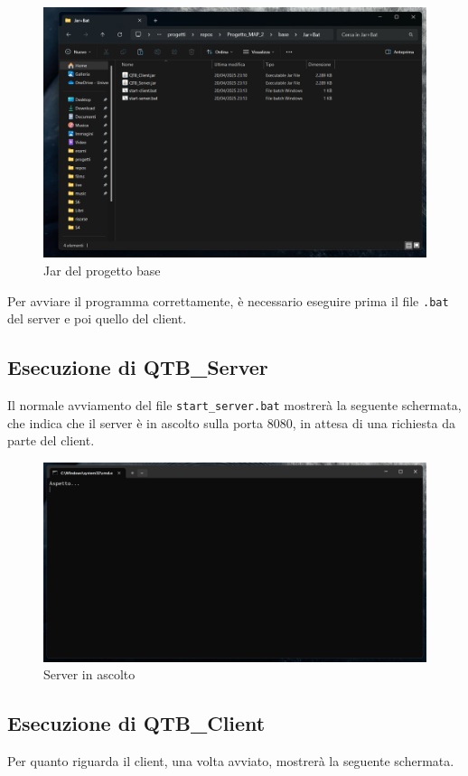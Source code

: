 \begin{figure}[h!]
    \centering
    \includegraphics[width = 0.5 \textwidth]{images/file jar base.png}
    \caption{Jar del progetto base}
\end{figure}


\begin{tcolorbox}[  colback=white!5!white, colframe=gray, title={Avvertenza} ]

    Per avviare il programma correttamente, è necessario eseguire prima il file \texttt{.bat} del server e poi quello del client.
\end{tcolorbox}

\subsection{Esecuzione di QTB\_Server}


Il normale avviamento del file \texttt{start\_server.bat} mostrerà la seguente schermata, che indica che il server è in ascolto sulla porta 8080, in attesa di una richiesta da parte del client.

\begin{figure}[h!]
    \centering
    \includegraphics[width = 0.5 \textwidth]{images/normale funzionamento del server.png}
    \caption{Server in ascolto}
    
\end{figure}

\subsection{Esecuzione di QTB\_Client}

Per quanto riguarda il client, una volta avviato, mostrerà la seguente schermata.

